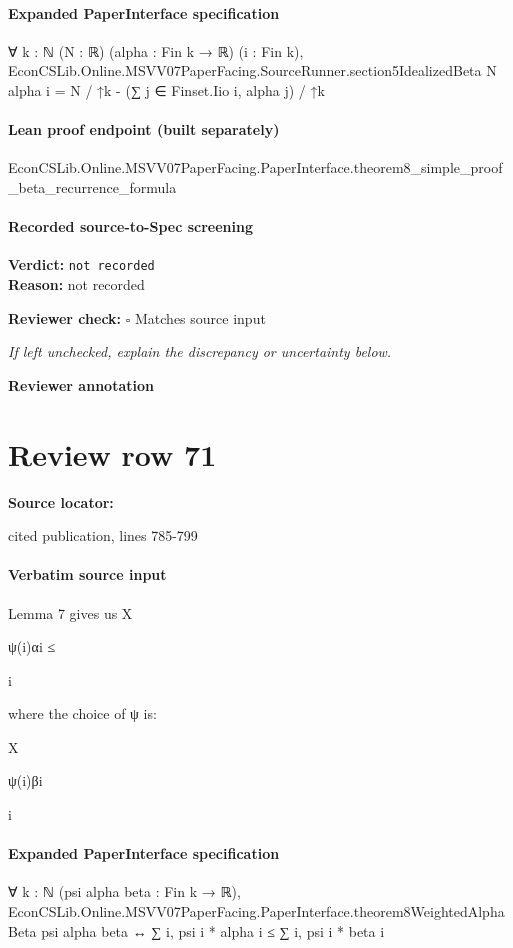 \documentclass[10pt]{article}
\newcommand{\reviewerbox}{%
  \par\noindent\fbox{\parbox{0.96\linewidth}{\rule{0pt}{0.38in}}}\par
}
\newcommand{\reviewmatch}[1]{%
  \par\noindent\textbf{Reviewer check:} $\square$\; #1\par
  \noindent\emph{If left unchecked, explain the discrepancy or uncertainty below.}\par
}
\begin{document}
\paragraph{Expanded PaperInterface specification}
\begin{ReviewVerbatim}
∀ {k : ℕ} (N : ℝ) (alpha : Fin k → ℝ) (i : Fin k),
  EconCSLib.Online.MSVV07PaperFacing.SourceRunner.section5IdealizedBeta N alpha i =
    N / ↑k - (∑ j ∈ Finset.Iio i, alpha j) / ↑k
\end{ReviewVerbatim}

\paragraph{Lean proof endpoint (built separately)}\begin{ReviewVerbatim}
EconCSLib.Online.MSVV07PaperFacing.PaperInterface.theorem8_simple_proof_beta_recurrence_formula
\end{ReviewVerbatim}

\paragraph{Recorded source-to-Spec screening}
\textbf{Verdict:} \texttt{not recorded}
\\
\textbf{Reason:} not recorded
\reviewmatch{Matches source input}
\noindent\textbf{Reviewer annotation}\par
\reviewerbox
\clearpage
\hypertarget{source-claim-e052dbdb5bf85adc}{}
\section*{Review row 71}
\textbf{Source locator:} {\footnotesize\raggedright cited publication, lines 785-\allowbreak{}799\par}
\paragraph{Verbatim source input}
\begin{ReviewVerbatim}
Lemma 7 gives us
X

ψ(i)αi ≤

i

where the choice of ψ is:

X

ψ(i)βi

i
\end{ReviewVerbatim}


\paragraph{Expanded PaperInterface specification}
\begin{ReviewVerbatim}
∀ {k : ℕ} (psi alpha beta : Fin k → ℝ),
  EconCSLib.Online.MSVV07PaperFacing.PaperInterface.theorem8WeightedAlphaBeta psi alpha beta ↔
    ∑ i, psi i * alpha i ≤ ∑ i, psi i * beta i
\end{ReviewVerbatim}
\end{document}

